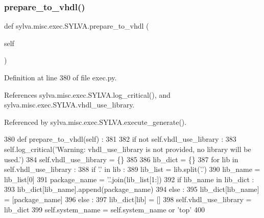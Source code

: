 \subsubsection{\texorpdfstring{prepare\+\_\+to\+\_\+vhdl()}{prepare\_to\_vhdl()}}
{\footnotesize\ttfamily def sylva.\+misc.\+exec.\+S\+Y\+L\+V\+A.\+prepare\+\_\+to\+\_\+vhdl (\begin{DoxyParamCaption}\item[{}]{self }\end{DoxyParamCaption})}



Definition at line 380 of file exec.\+py.



References sylva.\+misc.\+exec.\+S\+Y\+L\+V\+A.\+log\+\_\+critical(), and sylva.\+misc.\+exec.\+S\+Y\+L\+V\+A.\+vhdl\+\_\+use\+\_\+library.



Referenced by sylva.\+misc.\+exec.\+S\+Y\+L\+V\+A.\+execute\+\_\+generate().


\begin{DoxyCode}
380   \textcolor{keyword}{def }prepare\_to\_vhdl(self) :
381 
382     \textcolor{keywordflow}{if} \textcolor{keywordflow}{not} self.vhdl\_use\_library :
383       self.log\_critical(\textcolor{stringliteral}{'Warning: vhdl\_use\_library is not provided, no library will be used.'})
384       self.vhdl\_use\_library = \{\}
385 
386     lib\_dict = \{\}
387     \textcolor{keywordflow}{for} lib \textcolor{keywordflow}{in} self.vhdl\_use\_library :
388       \textcolor{keywordflow}{if} \textcolor{stringliteral}{'.'} \textcolor{keywordflow}{in} lib :
389         lib\_list = lib.split(\textcolor{stringliteral}{'.'})
390         lib\_name = lib\_list[0]
391         package\_name = \textcolor{stringliteral}{'.'}.join(lib\_list[1:])
392         \textcolor{keywordflow}{if} lib\_name \textcolor{keywordflow}{in} lib\_dict :
393           lib\_dict[lib\_name].append(package\_name)
394         \textcolor{keywordflow}{else} :
395           lib\_dict[lib\_name] = [package\_name]
396       \textcolor{keywordflow}{else} :
397         lib\_dict[lib] = []
398     self.vhdl\_use\_library = lib\_dict
399     self.system\_name = self.system\_name \textcolor{keywordflow}{or} \textcolor{stringliteral}{'top'}
400 
\end{DoxyCode}
\mbox{\label{classsylva_1_1misc_1_1exec_1_1_s_y_l_v_a_afb708ba8dd6289db279d8a9ab09cd1b5}} 
